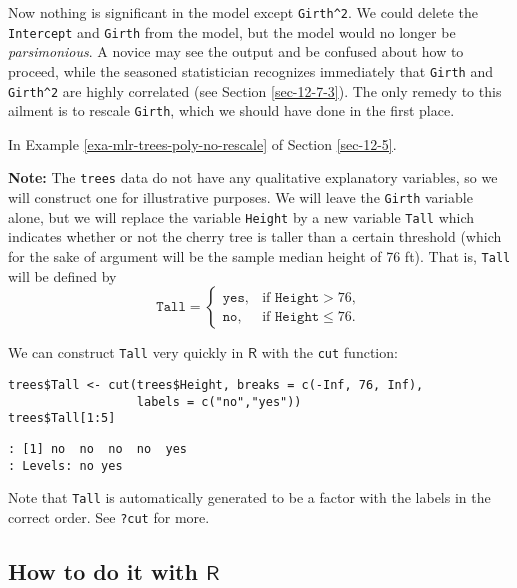 Now nothing is significant in the model except \texttt{Girth\textasciicircum{}2}. We could
delete the \texttt{Intercept} and \texttt{Girth} from the model, but the model would
no longer be \emph{parsimonious}. A novice may see the output and be
confused about how to proceed, while the seasoned statistician
recognizes immediately that \texttt{Girth} and \texttt{Girth\textasciicircum{}2} are highly
correlated (see Section \ref{sec-12-7-3}). The only remedy to this
ailment is to rescale \texttt{Girth}, which we should have done in the first
place.

In Example \ref{exa-mlr-trees-poly-no-rescale} of Section \ref{sec-12-5}.

\textbf{Note:} The \texttt{trees} data do not have any qualitative explanatory
variables, so we will construct one for illustrative
purposes.  We will leave the \texttt{Girth} variable alone,
but we will replace the variable \texttt{Height} by a new variable \texttt{Tall}
which indicates whether or not the cherry tree is taller than a
certain threshold (which for the sake of argument will be the sample
median height of 76 ft). That is, \texttt{Tall} will be defined by
\begin{equation} \mathtt{Tall} = \begin{cases} \mathtt{yes}, & \mbox{if }\mathtt{Height} > 76,\\ \mathtt{no}, & \mbox{if }\mathtt{Height}\leq 76. \end{cases} \end{equation}

We can construct \texttt{Tall} very quickly in \(\mathsf{R}\) with the \texttt{cut}
function:

\begin{verbatim}
trees$Tall <- cut(trees$Height, breaks = c(-Inf, 76, Inf), 
                  labels = c("no","yes"))
trees$Tall[1:5]
\end{verbatim}

\begin{verbatim}
: [1] no  no  no  no  yes
: Levels: no yes
\end{verbatim}

Note that \texttt{Tall} is automatically generated to be a factor with the
labels in the correct order. See \texttt{?cut} for more.

\subsection{How to do it with \(\mathsf{R}\)}
\label{sec-12-4-2}

